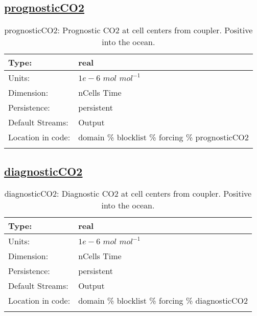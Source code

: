 \subsection[prognosticCO2]{\hyperref[sec:var_tab_forcing]{prognosticCO2}}
\label{subsec:var_sec_forcing_prognosticCO2}
\begin{center}
\begin{longtable}{| p{2.0in} | p{4.0in} |}
        \hline 
        Type: & real \\
        \hline 
        Units: & $1e-6$ $mol$ $mol^{-1}$ \\
        \hline 
        Dimension: & nCells Time \\
        \hline 
        Persistence: & persistent \\
        \hline 
		 Default Streams: & Output  \\
        \hline 
		 Location in code: & domain \% blocklist \% forcing \% prognosticCO2 \\
		 \hline 
    \caption{prognosticCO2: Prognostic CO2 at cell centers from coupler. Positive into the ocean.}
\end{longtable}
\end{center}
\subsection[diagnosticCO2]{\hyperref[sec:var_tab_forcing]{diagnosticCO2}}
\label{subsec:var_sec_forcing_diagnosticCO2}
\begin{center}
\begin{longtable}{| p{2.0in} | p{4.0in} |}
        \hline 
        Type: & real \\
        \hline 
        Units: & $1e-6$ $mol$ $mol^{-1}$ \\
        \hline 
        Dimension: & nCells Time \\
        \hline 
        Persistence: & persistent \\
        \hline 
		 Default Streams: & Output  \\
        \hline 
		 Location in code: & domain \% blocklist \% forcing \% diagnosticCO2 \\
		 \hline 
    \caption{diagnosticCO2: Diagnostic CO2 at cell centers from coupler. Positive into the ocean.}
\end{longtable}
\end{center}
